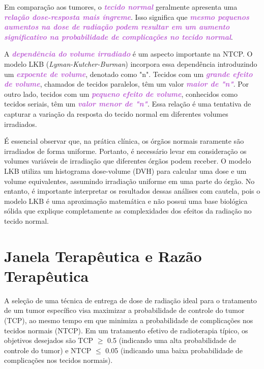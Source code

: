 \documentclass[11pt,a4paper]{article}
\begin{document}
	Em comparação aos tumores, o \textcolor{MediumOrchid}{\textbf{\textit{tecido normal}}} geralmente apresenta uma \textcolor{MediumOrchid}{\textbf{\textit{relação dose-resposta mais íngreme}}}. Isso significa que \textcolor{MediumOrchid}{\textbf{\textit{mesmo pequenos aumentos na dose de radiação podem resultar em um aumento significativo na probabilidade de complicações no tecido normal}}}.

	A \textcolor{MediumOrchid}{\textbf{\textit{dependência do volume irradiado}}} é um aspecto importante na NTCP. O modelo LKB (\textit{Lyman-Kutcher-Burman}) incorpora essa dependência introduzindo um \textcolor{MediumOrchid}{\textbf{\textit{expoente de volume}}}, denotado como "n". Tecidos com um \textcolor{MediumOrchid}{\textbf{\textit{grande efeito de volume}}}, chamados de tecidos paralelos, têm um valor \textcolor{MediumOrchid}{\textbf{\textit{maior de "n"}}}. Por outro lado, tecidos com um \textcolor{MediumOrchid}{\textbf{\textit{pequeno efeito de volume}}}, conhecidos como tecidos seriais, têm um \textcolor{MediumOrchid}{\textbf{\textit{valor menor de "n"}}}. Essa relação é uma tentativa de capturar a variação da resposta do tecido normal em diferentes volumes irradiados.

	É essencial observar que, na prática clínica, os órgãos normais raramente são irradiados de forma uniforme. Portanto, é necessário levar em consideração os volumes variáveis de irradiação que diferentes órgãos podem receber. O modelo LKB utiliza um histograma dose-volume (DVH) para calcular uma dose e um volume equivalentes, assumindo irradiação uniforme em uma parte do órgão. No entanto, é importante interpretar os resultados dessas análises com cautela, pois o modelo LKB é uma aproximação matemática e não possui uma base biológica sólida que explique completamente as complexidades dos efeitos da radiação no tecido normal.

\section{Janela Terapêutica e Razão Terapêutica}

	A seleção de uma técnica de entrega de dose de radiação ideal para o tratamento de um tumor específico visa maximizar a probabilidade de controle do tumor (TCP), ao mesmo tempo em que minimiza a probabilidade de complicações nos tecidos normais (NTCP). Em um tratamento efetivo de radioterapia típico, os objetivos desejados são TCP $\geq$ 0.5 (indicando uma alta probabilidade de controle do tumor) e NTCP $\leq$ 0.05 (indicando uma baixa probabilidade de complicações nos tecidos normais).
\end{document}
